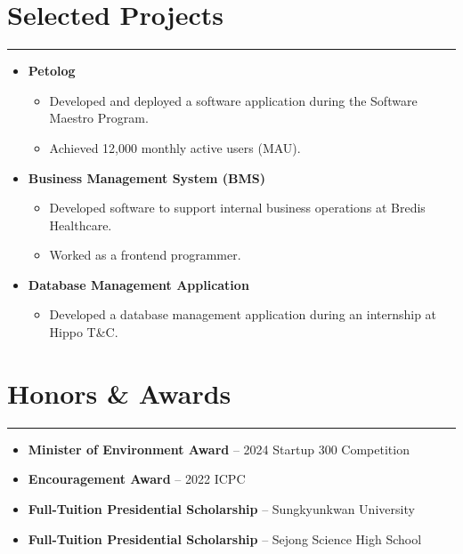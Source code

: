 \documentclass[letterpaper,10pt]{article}
\begin{document}
\section*{Selected Projects}
\hrule
\vspace{4pt}
\begin{itemize}

    \item \textbf{Petolog}
    \begin{itemize}
        \item Developed and deployed a software application during the Software Maestro Program.
        \item Achieved 12,000 monthly active users (MAU).
    \end{itemize}

    \item \textbf{Business Management System (BMS)}
    \begin{itemize}
        \item Developed software to support internal business operations at Bredis Healthcare.
        \item Worked as a frontend programmer.
    \end{itemize}

    \item \textbf{Database Management Application}
    \begin{itemize}
        \item Developed a database management application during an internship at Hippo T\&C.
    \end{itemize}

\end{itemize}

\section*{Honors \& Awards}
\hrule
\vspace{4pt}
\begin{itemize}
    \item \textbf{Minister of Environment Award} -- 2024 Startup 300 Competition
    \item \textbf{Encouragement Award} -- 2022 ICPC
    \item \textbf{Full-Tuition Presidential Scholarship} -- Sungkyunkwan University
    \item \textbf{Full-Tuition Presidential Scholarship} -- Sejong Science High School
\end{itemize}
\end{document}
